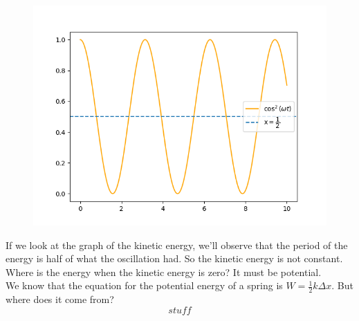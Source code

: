 \documentclass{report}
\begin{document}
        \begin{figure}
          \vspace{-1.4cm}
          \centering
          \includegraphics[width=\textwidth]{fotos/cos2.png}
        \end{figure}

        \noindent If we look at the graph of the kinetic energy, we'll observe that the period of the energy is half of what the oscillation had. So the kinetic energy is not constant. Where is the energy when the kinetic energy is zero? It must be potential.\\

        \noindent We know that the equation for the potential energy of a spring is $W=\frac{1}{2}k\Delta x$. But where does it come from?
        \begin{equation}
          stuff
        \end{equation}
        \hspace{0cm}\\\hspace{0cm}\\
\end{document}
